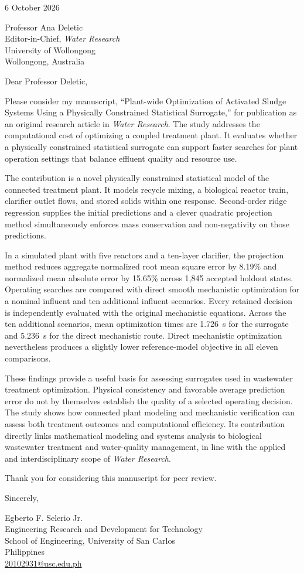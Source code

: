 \documentclass[11pt,a4paper]{article}
\begin{document}
\begin{flushright}
6 October 2026
\end{flushright}

Professor Ana Deletic\\
Editor-in-Chief, \textit{Water Research}\\
University of Wollongong\\
Wollongong, Australia

Dear Professor Deletic,

Please consider my manuscript, ``Plant-wide Optimization of Activated Sludge Systems Using a Physically Constrained Statistical Surrogate,'' for publication as an original research article in \textit{Water Research}. The study addresses the computational cost of optimizing a coupled treatment plant. It evaluates whether a physically constrained statistical surrogate can support faster searches for plant operation settings that balance effluent quality and resource use.

The contribution is a novel physically constrained statistical model of the connected treatment plant. It models recycle mixing, a biological reactor train, clarifier outlet flows, and stored solids within one response. Second-order ridge regression supplies the initial predictions and a clever quadratic projection method simultaneously enforces mass conservation and non-negativity on those predictions.

In a simulated plant with five reactors and a ten-layer clarifier, the projection method reduces aggregate normalized root mean square error by 8.19\% and normalized mean absolute error by 15.65\% across 1,845 accepted holdout states. Operating searches are compared with direct smooth mechanistic optimization for a nominal influent and ten additional influent scenarios. Every retained decision is independently evaluated with the original mechanistic equations. Across the ten additional scenarios, mean optimization times are 1.726~s for the surrogate and 5.236~s for the direct mechanistic route. Direct mechanistic optimization nevertheless produces a slightly lower reference-model objective in all eleven comparisons.

These findings provide a useful basis for assessing surrogates used in wastewater treatment optimization. Physical consistency and favorable average prediction error do not by themselves establish the quality of a selected operating decision. The study shows how connected plant modeling and mechanistic verification can assess both treatment outcomes and computational efficiency. Its contribution directly links mathematical modeling and systems analysis to biological wastewater treatment and water-quality management, in line with the applied and interdisciplinary scope of \textit{Water Research}.

Thank you for considering this manuscript for peer review.

Sincerely,

Egberto F. Selerio Jr.\\
Engineering Research and Development for Technology\\
School of Engineering, University of San Carlos\\
Philippines\\
\href{mailto:20102931@usc.edu.ph}{20102931@usc.edu.ph}
\end{document}
